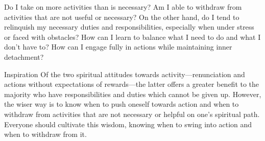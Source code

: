 


\newpage
\begin{mananam}{} 
\mananamtext Do I take on more activities than is necessary? Am I able to withdraw from activities that are not useful or necessary? On the other hand, do I tend to relinquish my necessary duties and responsibilities, especially when under stress or faced with obstacles? How can I learn to balance what I need to do and what I don’t have to? How can I engage fully in actions while maintaining inner detachment?  
\end{mananam}
\WritingHand{}
\begin{inspiration}{\mananamfont Inspiration}
\mananamtext Of the two spiritual attitudes towards activity—renunciation and actions without expectations of rewards—the latter offers a greater benefit to the majority who have responsibilities and duties which cannot be given up. However, the wiser way is to know when to push oneself towards action and when to withdraw from activities that are not necessary or helpful on one’s spiritual path. Everyone should cultivate this wisdom, knowing when to swing into action and when to withdraw from it.
\end{inspiration}
\newpage


